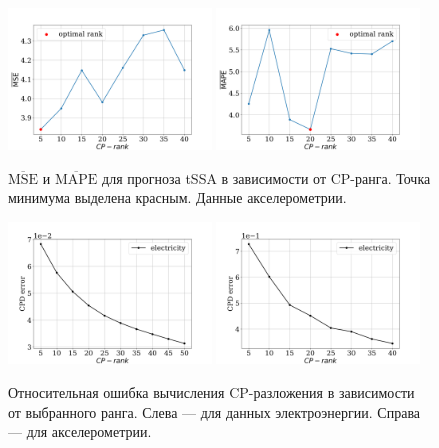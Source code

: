 			\begin{figure}[h]
				\centering
				\includegraphics[width=0.48\textwidth, keepaspectratio]{../experiments/motion_1/tssa/figs/prediction/MSE_rank.png}
				\includegraphics[width=0.48\textwidth, keepaspectratio]{../experiments/motion_1/tssa/figs/prediction/MAPE_rank.png}
				\caption{$ \overline{\text{MSE}} $ и $ \overline{\text{MAPE}} $ для прогноза tSSA в зависимости от CP-ранга. Точка минимума выделена красным. Данные акселерометрии.}\label{fig:mse_mape_motion}
			\end{figure}
			
			\begin{figure}[h]
				\centering
				\includegraphics[width=0.48\textwidth, keepaspectratio]{../experiments/electricity/tssa/figs/CPD_error.png}
				\includegraphics[width=0.48\textwidth, keepaspectratio]{../experiments/motion_1/tssa/figs/CPD_error.png}
				\caption{Относительная ошибка вычисления CP-разложения в зависимости от выбранного ранга. Слева --- для данных электроэнергии. Справа --- для акселерометрии.}\label{fig:cpd_errors}
			\end{figure}
			
